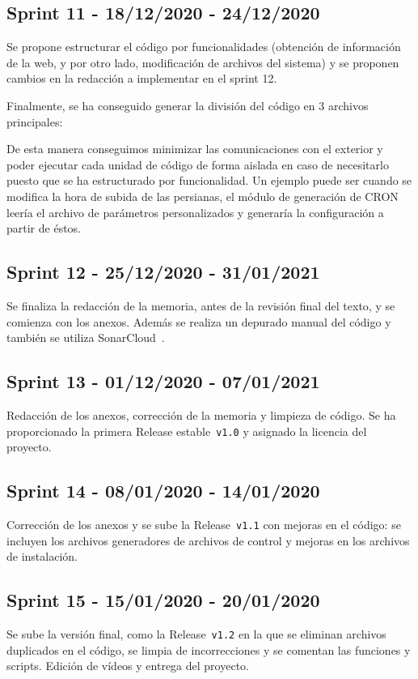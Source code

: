 \subsection{Sprint 11 - 18/12/2020 - 24/12/2020}
Se propone estructurar el código por funcionalidades (obtención de información de la web, y por otro lado, modificación de archivos del sistema) y se proponen cambios en la redacción a implementar en el sprint 12.


Finalmente, se ha conseguido generar la división del código en 3 archivos principales:

De esta manera conseguimos minimizar las comunicaciones con el exterior y poder ejecutar cada unidad de código de forma aislada en caso de necesitarlo puesto que se ha estructurado por funcionalidad. Un ejemplo puede ser cuando se modifica la hora de subida de las persianas, el módulo de generación de CRON leería el archivo de parámetros personalizados y generaría la configuración a partir de éstos.


\subsection{Sprint 12 - 25/12/2020 - 31/01/2021}
Se finaliza la redacción de la memoria, antes de la revisión final del texto, y se comienza con los anexos. Además se realiza un depurado manual del código y también se utiliza SonarCloud~\cite{misc:sonarcloud}.

\subsection{Sprint 13 - 01/12/2020 - 07/01/2021}
Redacción de los anexos, corrección de la memoria y limpieza de código.
Se ha proporcionado la primera Release estable~\texttt{v1.0} y asignado la licencia del proyecto.

\subsection{Sprint 14 - 08/01/2020 - 14/01/2020}
Corrección de los anexos y se sube la Release~\texttt{v1.1} con mejoras en el código: se incluyen los archivos generadores de archivos de control y mejoras en los archivos de instalación.

\subsection{Sprint 15 - 15/01/2020 - 20/01/2020}
Se sube la versión final, como la Release~\texttt{v1.2} en la que se eliminan archivos duplicados en el código, se limpia de incorrecciones y se comentan las funciones y scripts. 
Edición de vídeos y entrega del proyecto.


